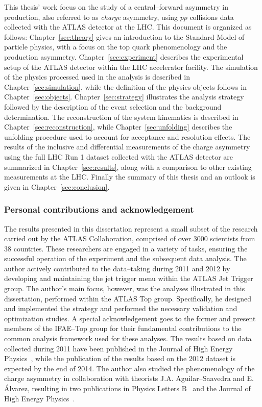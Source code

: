 This thesis' work focus on the study of a central--forward asymmetry in
\ttbar{} production, also referred to as {\it
  charge} asymmetry, using $pp$ collisions data collected with the
ATLAS detector at the LHC. This document is organized as follows:
Chapter~\ref{sec:theory} gives an introduction to the Standard Model
of particle physics, with a focus on the top quark phenomenology and
the production asymmetry. Chapter~\ref{sec:experiment} describes the
experimental setup of the ATLAS detector within the LHC accelerator
facility. 
The simulation of the physics processed
used in the analysis is described in Chapter~\ref{sec:simulation},
while the definition of the physics objects follows in
Chapter~\ref{sec:objects}. Chapter~\ref{sec:strategy} illustrates the
analysis strategy followed by the description of the event selection
and the background determination. The reconstruction of the \ttbar{}
system kinematics is described in Chapter~\ref{sec:reconstruction},
while Chapter~\ref{sec:unfolding} describes the unfolding procedure
used to account for acceptance and resolution effects.
The results of the inclusive and differential measurements of the
\ttbar{} charge asymmetry using the full LHC Run 1 dataset collected
with the ATLAS detector are summarized in Chapter~\ref{sec:results},
along with a comparison to other existing measurements at the LHC.
Finally the summary of this thesis and an outlook is given in
Chapter~\ref{sec:conclusion}.

\subsubsection*{Personal contributions and acknowledgement}

The results presented in this dissertation represent a small subset of
the research carried out by the ATLAS Collaboration, comprised of over
3000 scientists from 38 countries. These researchers are engaged in a
variety of tasks, ensuring the successful operation of the experiment and
the subsequent data analysis. The author actively contributed to the
data--taking during 2011 and 2012 by developing and maintaining the
jet trigger menu within the ATLAS Jet Trigger group. 
The author's main focus, however, was the analyses illustrated in this
dissertation, performed within the ATLAS Top group. Specifically, he
designed and implemented the strategy and performed the necessary
validation and optimization studies.
A special acknowledgement goes to the former and present members of
the IFAE--Top group for their fundamental contributions to the common
analysis framework used for these analyses.
The results based on data collected during 2011 have been published in
the Journal of High Energy Physics~\cite{Aad:2013cea}, while the
publication of the results based on the 2012 dataset is expected by
the end of 2014.
The author also studied the phenomenology of the \ttbar{} charge
asymmetry in collaboration with theorists J.A. Aguilar--Saavedra and
E. \'Alvarez, resulting in two publications in Physics Letters
B~\cite{AguilarSaavedra:2011cp} and the Journal of High Energy
Physics~\cite{Aguilar-Saavedra:2014vta}.

